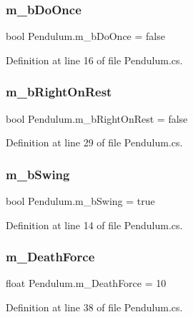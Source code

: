 \subsubsection{\texorpdfstring{m\+\_\+b\+Do\+Once}{m\_bDoOnce}}
{\footnotesize\ttfamily bool Pendulum.\+m\+\_\+b\+Do\+Once = false}



Definition at line 16 of file Pendulum.\+cs.

\mbox{\label{class_pendulum_a12661344b4893ab6a6ba99d074c582a5}} 
\subsubsection{\texorpdfstring{m\+\_\+b\+Right\+On\+Rest}{m\_bRightOnRest}}
{\footnotesize\ttfamily bool Pendulum.\+m\+\_\+b\+Right\+On\+Rest = false}



Definition at line 29 of file Pendulum.\+cs.

\mbox{\label{class_pendulum_a4e3df49f9efcd5e1df29a84557720e34}} 
\subsubsection{\texorpdfstring{m\+\_\+b\+Swing}{m\_bSwing}}
{\footnotesize\ttfamily bool Pendulum.\+m\+\_\+b\+Swing = true}



Definition at line 14 of file Pendulum.\+cs.

\mbox{\label{class_pendulum_a6a774a542e6c6be8b1b9257143aad31a}} 
\subsubsection{\texorpdfstring{m\+\_\+\+Death\+Force}{m\_DeathForce}}
{\footnotesize\ttfamily float Pendulum.\+m\+\_\+\+Death\+Force = 10}



Definition at line 38 of file Pendulum.\+cs.

